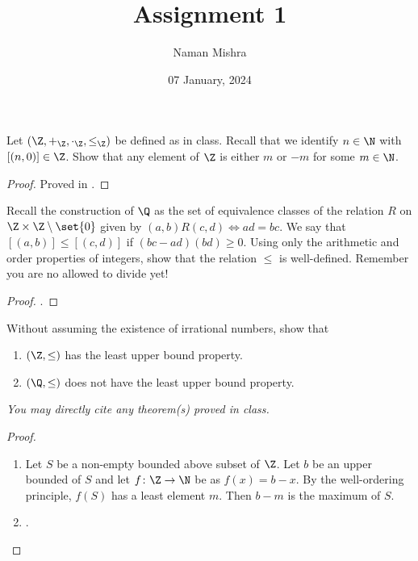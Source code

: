 \documentclass[12pt]{article}
\title{Assignment 1}
\author{Naman Mishra}
\date{07 January, 2024}
\begin{document}
\maketitle
\setcounter{assignment}{1}

\begin{problem}
    Let $(\Z, +_\Z, \cdot_\Z, \le_\Z)$ be defined as in class.
    Recall that we identify $n \in \N$ with $[(n, 0)] \in \Z$.
    Show that any element of $\Z$ is either $m$ or $-m$ for some $m \in \N$.
\end{problem}
\begin{proof}
    Proved in .
\end{proof}

\begin{problem}
    Recall the construction of $\Q$ as the set of equivalence classes of the
    relation $R$ on $\Z \times \Z \setminus \set{0}$ given by
    $(a, b) R (c, d) \iff ad = bc$.
    We say that $[(a, b)] \le [(c, d)]$ if $(bc - ad)(bd) \ge 0$.
    Using only the arithmetic and order properties of integers, show that the
    relation $\le$ is well-defined.
    Remember you are no allowed to divide yet!
\end{problem}
\begin{proof}
    .
\end{proof}

\begin{problem} \label{prob:ZQ:lub}
    Without assuming the existence of irrational numbers, show that
    \begin{enumerate}[label=(\alph*)]
        \item $(\Z, \le)$ has the least upper bound property.
        \item $(\Q, \le)$ does not have the least upper bound property.
    \end{enumerate}
    \textit{You may directly cite any theorem(s) proved in class.}
\end{problem}
\begin{proof} \leavevmode
    \begin{enumerate}[label=(\alph*)]
        \item Let $S$ be a non-empty bounded above subset of $\Z$.
        Let $b$ be an upper bounded of $S$ and let $f \colon \Z \to \N$ be as
        $f(x) = b - x$.
        By the well-ordering principle, $f(S)$ has a least element $m$.
        Then $b - m$ is the maximum of $S$.
        \item {}. \qedhere
    \end{enumerate}
\end{proof}
\end{document}
